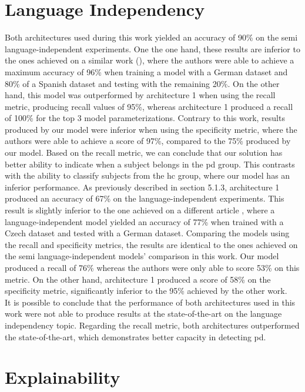 \section{Language Independency}

Both architectures used during this work yielded an accuracy of 90\% on the semi language-independent experiments. One the one hand, these results are inferior to the ones achieved on a similar work (\cite{parkinson_three_languages}), where the authors were able to achieve a maximum accuracy of 96\% when training a model with a German dataset and 80\% of a Spanish dataset and testing with the remaining 20\%. On the other hand, this model was outperformed by architecture 1 when using the recall metric, producing recall values of 95\%, whereas architecture 1 produced a recall of 100\% for the top 3 model parameterizations. Contrary to this work, results produced by our model were inferior when using the specificity metric, where the authors were able to achieve a score of 97\%, compared to the 75\% produced by our model. Based on the recall metric, we can conclude that our solution has better ability to indicate when a subject belongs in the \gls{pd} group. This contrasts with the ability to classify subjects from the \gls{hc} group, where our model has an inferior performance. As previously described in section 5.1.3, architecture 1 produced an accuracy of 67\% on the language-independent experiments. This result is slightly inferior to the one achieved on a different article \cite{parkinson_three_languages}, where a language-independent model yielded an accuracy of 77\% when trained with a Czech dataset and tested with a German dataset. Comparing the models using the recall and specificity metrics, the results are identical to the ones achieved on the semi language-independent models' comparison in this work. Our model produced a recall of 76\% whereas the authors were only able to score 53\% on this metric. On the other hand, architecture 1 produced a score of 58\% on the specificity metric, significantly inferior to the 95\% achieved by the other work. \\
It is possible to conclude that the performance of both architectures used in this work were not able to produce results at the state-of-the-art on the language independency topic. Regarding the recall metric, both architectures outperformed the state-of-the-art, which demonstrates better capacity in detecting \gls{pd}.

\section{Explainability}

